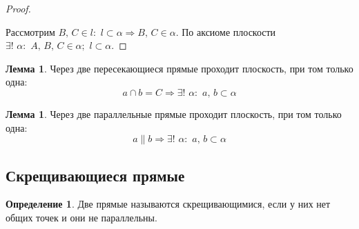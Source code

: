 \documentclass[12pt]{article}
\theoremstyle{definition}
\newtheorem{lemma}[theorem]{Лемма}
\newtheorem{definition}{Определение}
\begin{document}
    \begin{proof}
        $ $\par\nobreak\ignorespaces
        \begin{center}
        \end{center}
        Рассмотрим $B,\,C\in l:\,\,l\subset\alpha\Longrightarrow B,\,C\in\alpha.$ По аксиоме плоскости $\exists!\,\,\alpha:\,\,A,\,B,\,C\in\alpha;\,\,l\subset\alpha.$
    \end{proof}
    
    \begin{lemma}\label{Пересекающиеся прямые и плоскость}
        Через две пересекающиеся прямые проходит плоскость, при том только одна:
        $$a\cap b = C\Longrightarrow\exists!\,\,\alpha:\,\,a,\,b\subset\alpha$$
    \end{lemma}
    \begin{lemma}
        Через две параллельные прямые проходит плоскость, при том только одна:
        $$a\parallel b\Longrightarrow\exists!\,\,\alpha:\,\,a,\,b\subset\alpha$$
    \end{lemma}
    
    \subsection{Скрещивающиеся прямые}
    
    \begin{definition}
        Две прямые называются скрещивающимися, если у них нет общих точек и они не параллельны.
    \end{definition}
    
\end{document}
